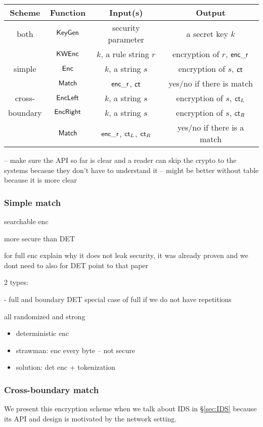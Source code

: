 \begin{tabular}{c|c|c|c}
Scheme    & Function        & Input(s) & Output \\
\hline
 both                & $\mathsf{KeyGen}$     & security parameter	      & a secret key $k$ \\ 
                 & $\mathsf{KWEnc}$	& $k$, a rule string $r$   &  encryption of $r$, $\mathsf{enc\_r}$ \\
\hline
  simple               & $\mathsf{Enc}$           &  $k$, a string $s$                        &  encryption of $s$, $\mathsf{ct}$          \\
                 & $\mathsf{Match}$  & $\mathsf{enc\_r}$, $\mathsf{ct}$ & yes/no if there is match \\
\hline
  cross-               & $\mathsf{EncLeft}$  & $k$, a string $s$ &encryption of $s$, $\mathsf{ct}_L$   \\
   boundary              & $\mathsf{EncRight}$ & $k$, a string $s$ & encryption of $s$, $\mathsf{ct}_R$  \\
                 & $\mathsf{Match}$ & $\mathsf{enc\_r}$, $\mathsf{ct}_L$, $\mathsf{ct}_R$ & yes/no if there is a match \\
\end{tabular}

-- make sure the API so far is clear and a reader can skip the crypto to the systems becasue they don't have
to understand it 
-- might be better without table because it is more clear

\subsubsection{Simple match}


searchable enc

more secure than DET

for full enc explain why it does not leak security, it was already proven and we dont need to 
also for DET point to that paper 

2 types:

- full and boundary
DET special case of full if we do not have repetitions

all randomized and strong

\begin{itemize}
\item deterministic enc
\item strawman: enc every byte -- not secure
\item solution: det enc + tokenization
\end{itemize}

\subsubsection{Cross-boundary match}

We present this encryption scheme when we talk about IDS in \S\ref{sec:IDS} because its API and design is
motivated by the network setting.



